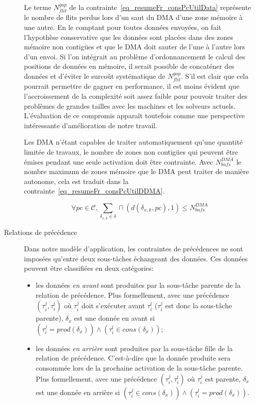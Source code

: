 \documentclass[main.tex]{subfiles}
\begin{document}
\begin{description}
        Le terme $N_{flit}^{gap}$ de la contrainte~\ref{eq_resumeFr_consPcUtilData} représente le nombre de flits perdus lors d'un saut du DMA d'une zone mémoire à une autre. En le comptant pour toutes données envoyées, on fait l'hypothèse conservative que les données sont placées dans des zones mémoire non contigües et que le DMA doit sauter de l'une à l'autre lors d'un envoi. Si l'on intégrait au problème d'ordonnancement le calcul des positions de données en mémoire, il serait possible de concaténer des données et d'éviter le surcoût systématique de $N_{flit}^{gap}$. S'il est clair que cela pourrait permettre de gagner en performance, il est moins évident que l'accroissement de la complexité soit assez faible pour pouvoir traiter des problèmes de grandes tailles avec les machines et les solveurs actuels. L'évaluation de ce compromis apparaît toutefois comme une perspective intéressante d'amélioration de notre travail.

        Les DMA n'étant capables de traiter automatiquement qu'une quantité limitée de travaux, le nombre de zones non contigües qui peuvent être émises pendant une seule activation doit être contrainte. Avec $N_{bufs}^{DMA}$ le nombre maximum de zones mémoire que le DMA peut traiter de manière autonome, cela est traduit dans la contrainte~\ref{eq_resumeFr_consPcUtilDDMA}.

\begin{equation}
    \label{eq_resumeFr_consPcUtilDDMA}
    \forall pc \in \mathcal{C} , 
    \sum_{\delta_{x,k} \in \delta} \sqcap ( d(\delta_{x,k} , pc) , 1 ) \leq N_{bufs}^{DMA}
\end{equation}

    \item[Relations de précédence]
        Dans notre modèle d'application, les contraintes de précédences ne sont imposées qu'entre deux sous-tâches échangeant des données. Ces données peuvent être classifiées en deux catégories:
        \begin{itemize}
            \item les données \emph{en avant} sont produites par la sous-tâche parente de la relation de précédence. Plus formellement, avec une précédence $(\tau_i^j , \tau_i^l )$ où $\tau_i^j$ doit s'exécuter avant $\tau_i^l$ ($\tau_i^j$ est donc la sous-tâche parente), $\delta_x$ est une donnée en avant si $(\tau_i^j = prod(\delta_x)) \land (\tau_i^l \in cons(\delta_x))$;
            \item les données \emph{en arrière} sont produites par la sous-tâche fille de la relation de précédence. C'est-à-dire que la donnée produite sera consommée lors de la prochaine activation de la sous-tâche parente. Plus formellement, avec une précédence $(\tau_i^j , \tau_i^l )$ où $\tau_i^j$ est parente, $\delta_x$ est une donnée en arrière si $(\tau_i^j \in cons(\delta_x)) \land (\tau_i^l = prod(\delta_x))$.
        \end{itemize}
        

\end{description}
\end{document}
